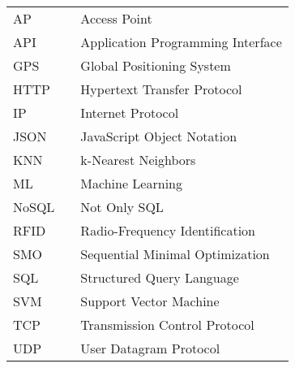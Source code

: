 \begin{table}[H]
\centering
\label{my-label}
\begin{tabular}{lll}
AP    &  & Access Point                                                          \\
API   &  & Application Programming Interface                                     \\
GPS   &  & Global Positioning System                                             \\
HTTP  &  &  Hypertext Transfer Protocol                                          \\
IP    &  & Internet Protocol                                                     \\
JSON  &  & JavaScript Object Notation                                            \\
KNN   &  & k-Nearest Neighbors                                                   \\
ML    &  & Machine Learning                                                      \\
NoSQL &  & Not Only SQL                                                          \\
RFID  &  & Radio-Frequency Identification                                        \\
SMO   &  & Sequential Minimal Optimization                                       \\
SQL   &  & Structured Query Language                                             \\
SVM   &  & Support Vector Machine                                                \\   
TCP   &  & Transmission Control Protocol                                         \\
UDP   &  & User Datagram Protocol                                            
\end{tabular}
\end{table}